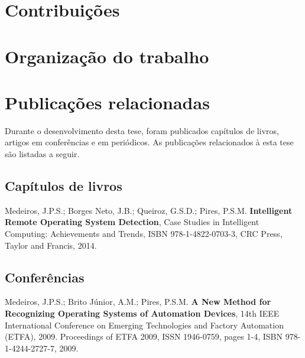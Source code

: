 \section{Contribuições}
\label{sec:1:contribuicoes}

\section{Organização do trabalho}
\label{sec:1:organizacao}

\section{Publicações relacionadas}
\label{sec:1:publicacoes}

Durante o desenvolvimento desta tese, foram publicados capítulos de livros,
artigos em conferências e em periódicos.
As publicações relacionados à esta tese são listadas a seguir.

\subsection*{Capítulos de livros}
\begin{compactenum}

\item Medeiros, J.P.S.; Borges Neto, J.B.; Queiroz, G.S.D.; Pires, P.S.M.
{\bf Intelligent Remote Operating System Detection},
Case Studies in Intelligent Computing: Achievements and Trends,
ISBN 978-1-4822-0703-3,
CRC Press, Taylor and Francis, 2014.

\end{compactenum}

\subsection*{Conferências}
\begin{compactenum}

\item Medeiros, J.P.S.; Brito Júnior, A.M.; Pires, P.S.M.
{\bf A New Method for Recognizing Operating Systems of Automation Devices},
14th IEEE International Conference on Emerging Technologies and Factory
Automation (ETFA), 2009.
Proceedings of ETFA 2009, ISSN 1946-0759, pages 1-4, ISBN 978-1-4244-2727-7,
2009.

\end{compactenum}

